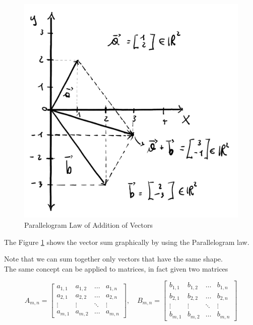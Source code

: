 \begin{figure}[h]
    \centering
    \includegraphics[scale=0.25]{Images/Linear_Algebra-vector-sum2.png}
    \caption{Parallelogram Law of Addition of Vectors}
    \label{fig:vector-sum-2}
\end{figure} 

The Figure \ref{fig:vector-sum-2} shows the vector sum graphically by using the Parallelogram law.

Note that we can sum together only vectors that have the same shape.
\\

The same concept can be applied to matrices, in fact given two matrices 

$$
A_{m,n} = \begin{bmatrix}
    a_{1,1} & a_{1,2} & \dots & a_{1,n} \\
    a_{2,1} & a_{2,2} & \dots & a_{2,n} \\
    \vdots & \vdots & \ddots & \vdots \\
    a_{m,1} & a_{m,2} & \dots & a_{m,n}
\end{bmatrix}, \quad
B_{m,n} = \begin{bmatrix}
    b_{1,1} & b_{1,2} & \dots & b_{1,n} \\
    b_{2,1} & b_{2,2} & \dots & b_{2,n} \\
    \vdots & \vdots & \ddots & \vdots \\
    b_{m,1} & b_{m,2} & \dots & b_{m,n}
\end{bmatrix}
$$

